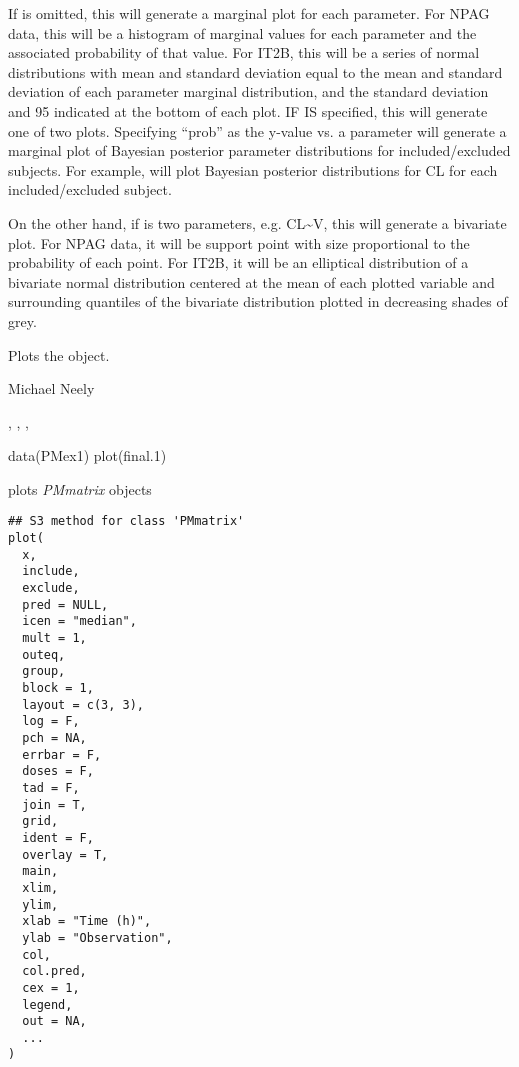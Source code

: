 \documentclass[a4paper]{book}
\begin{document}
\begin{Details}\relax
If  is omitted, this will generate a marginal plot for each parameter.  
For NPAG data, this will be a histogram of marginal values for each parameter and the associated probability
of that value.  For IT2B, this will be a series of normal distributions with mean and standard deviation
equal to the mean and standard deviation of each parameter marginal distribution, and the standard deviation and 95
indicated at the bottom of each plot.  IF  IS specified,
this will generate one of two plots.  Specifying ``prob'' as the y-value vs. a parameter
will generate a marginal plot of Bayesian posterior parameter distributions for included/excluded
subjects.  For example,  will plot Bayesian posterior distributions for CL for each 
included/excluded subject.

On the other hand, if  is two parameters, e.g. CL\textasciitilde{}V, this will generate a bivariate plot.  
For NPAG data, it will be support point with size proportional to the probability
of each point.  For IT2B, it will be an elliptical distribution of a bivariate normal distribution centered at the mean
of each plotted variable and surrounding quantiles of the bivariate distribution plotted in decreasing shades of grey.
\end{Details}
%
\begin{Value}
Plots the object.
\end{Value}
%
\begin{Author}\relax
Michael Neely
\end{Author}
%
\begin{SeeAlso}\relax
{}, , , 
\end{SeeAlso}
%
\begin{Examples}
\begin{ExampleCode}
data(PMex1)
plot(final.1)
\end{ExampleCode}
\end{Examples}
%
\begin{Description}\relax
{} plots \emph{PMmatrix} objects
\end{Description}
%
\begin{Usage}
\begin{verbatim}
## S3 method for class 'PMmatrix'
plot(
  x,
  include,
  exclude,
  pred = NULL,
  icen = "median",
  mult = 1,
  outeq,
  group,
  block = 1,
  layout = c(3, 3),
  log = F,
  pch = NA,
  errbar = F,
  doses = F,
  tad = F,
  join = T,
  grid,
  ident = F,
  overlay = T,
  main,
  xlim,
  ylim,
  xlab = "Time (h)",
  ylab = "Observation",
  col,
  col.pred,
  cex = 1,
  legend,
  out = NA,
  ...
)
\end{verbatim}
\end{Usage}
\end{document}
